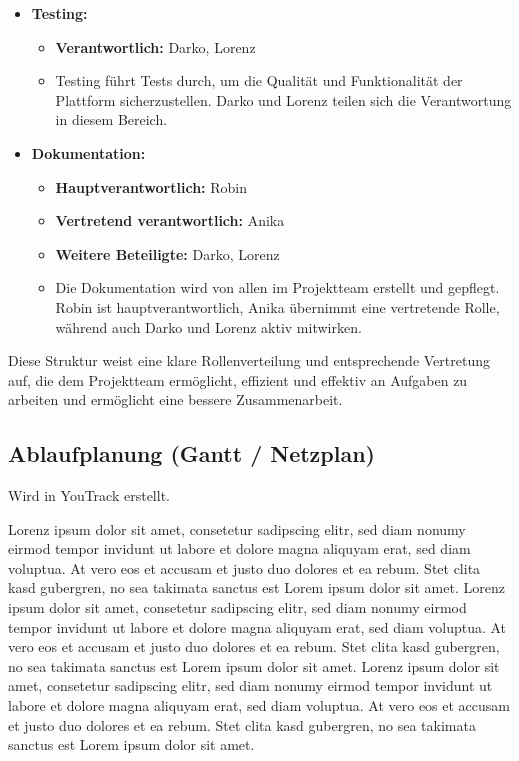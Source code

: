 \begin{itemize}
    \item \textbf{Testing:}
    \begin{itemize}
        \item \textbf{Verantwortlich:} Darko, Lorenz
        \item Testing führt Tests durch, um die Qualität und Funktionalität der Plattform sicherzustellen.
        Darko und Lorenz teilen sich die Verantwortung in diesem Bereich.
    \end{itemize}

    \item \textbf{Dokumentation:}
    \begin{itemize}
        \item \textbf{Hauptverantwortlich:} Robin
        \item \textbf{Vertretend verantwortlich:} Anika
        \item \textbf{Weitere Beteiligte:} Darko, Lorenz
        \item Die Dokumentation wird von allen im Projektteam erstellt und gepflegt.
        Robin ist hauptverantwortlich, Anika übernimmt eine vertretende Rolle, während auch Darko und Lorenz aktiv mitwirken.
    \end{itemize}
\end{itemize}


Diese Struktur weist eine klare Rollenverteilung und entsprechende Vertretung auf, die dem Projektteam ermöglicht, effizient und effektiv an Aufgaben zu arbeiten und ermöglicht eine bessere Zusammenarbeit.



\subsection{Ablaufplanung (Gantt / Netzplan)}\label{subsec:ablaufplan}
Wird in YouTrack erstellt.

Lorenz ipsum dolor sit amet, consetetur sadipscing elitr, sed diam nonumy eirmod tempor invidunt ut labore et dolore magna aliquyam erat, sed diam voluptua.
At vero eos et accusam et justo duo dolores et ea rebum.
Stet clita kasd gubergren, no sea takimata sanctus est Lorem ipsum dolor sit amet.
Lorenz ipsum dolor sit amet, consetetur sadipscing elitr, sed diam nonumy eirmod tempor invidunt ut labore et dolore magna aliquyam erat, sed diam voluptua.
At vero eos et accusam et justo duo dolores et ea rebum.
Stet clita kasd gubergren, no sea takimata sanctus est Lorem ipsum dolor sit amet.
Lorenz ipsum dolor sit amet, consetetur sadipscing elitr, sed diam nonumy eirmod tempor invidunt ut labore et dolore magna aliquyam erat, sed diam voluptua.
At vero eos et accusam et justo duo dolores et ea rebum.
Stet clita kasd gubergren, no sea takimata sanctus est Lorem ipsum dolor sit amet.


